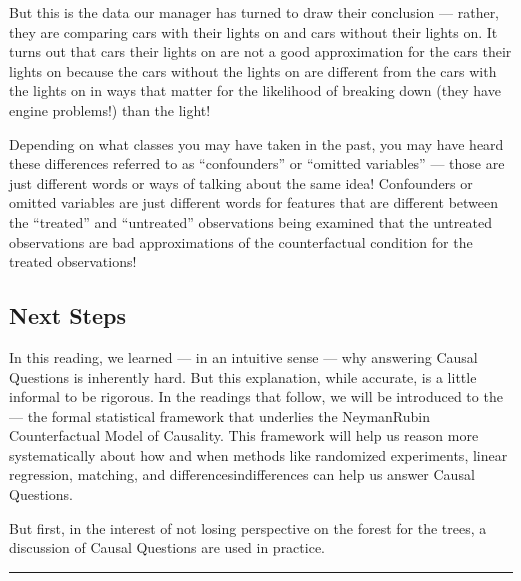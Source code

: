 \documentclass[letterpaper,10pt,english]{jupyterBook}
\begin{document}
\sphinxAtStartPar
But this is  the data our manager has turned to draw their conclusion — rather, they are comparing cars with their  lights on and cars without their  lights on. It turns out that cars  their  lights on are not a good approximation for the cars  their  lights on because the cars without the lights on are different from the cars with the lights on in ways that matter for the likelihood of breaking down (they have engine problems!)  than the  light!

\sphinxAtStartPar
Depending on what classes you may have taken in the past, you may have heard these differences referred to as “confounders” or “omitted variables” — those are just different words or ways of talking about the same idea! Confounders or omitted variables are just different words for features that are different between the “treated” and “untreated” observations being examined that the untreated observations are bad approximations of the counter\sphinxhyphen{}factual condition for the treated observations!


\subsection{Next Steps}
\label{\detokenize{30_questions/40_answering_causal_questions:next-steps}}
\sphinxAtStartPar
In this reading, we learned — in an intuitive sense — why answering Causal Questions is inherently hard. But this explanation, while accurate, is a little informal to be rigorous. In the readings that follow, we will be introduced to the  — the formal statistical framework that underlies the Neyman\sphinxhyphen{}Rubin Counterfactual Model of Causality. This framework will help us reason more systematically about how and when methods like randomized experiments, linear regression, matching, and differences\sphinxhyphen{}in\sphinxhyphen{}differences can help us answer Causal Questions.

\sphinxAtStartPar
But first, in the interest of not losing perspective on the forest for the trees, a discussion of  Causal Questions are used in practice.


\bigskip\hrule\bigskip
\end{document}
